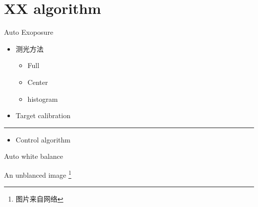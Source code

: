 \documentclass[presentation]{beamer}
\begin{document}
\section{XX algorithm}
\label{sec:orgd20dca1}
\begin{frame}[label={sec:orgeb8c952}]{Auto Exoposure}
\begin{itemize}
\item 测光方法
\begin{itemize}
\item Full
\item Center
\item histogram
\end{itemize}
\item Target calibration
\end{itemize}

\center\rule{0.5\paperwidth}{0.4pt}

\begin{itemize}
\item Control algorithm
\end{itemize}
\end{frame}
\begin{frame}[label={sec:org42bd769}]{Auto white balance}
\begin{block}{An unblanced image}
 \footnote{图片来自网络}
\end{block}
\end{frame}
\end{document}
